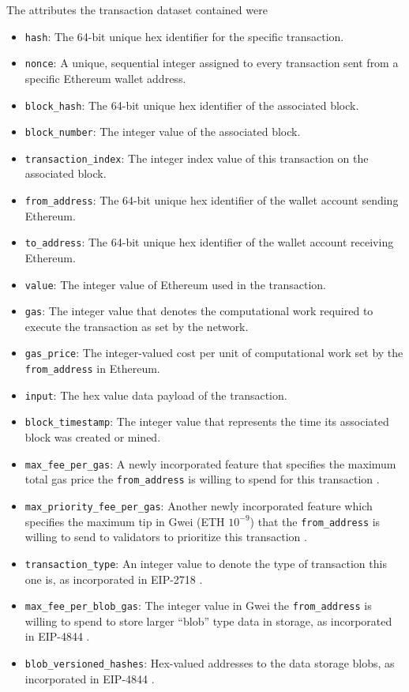 \documentclass[sigconf]{acmart}
\begin{document}
The attributes the transaction dataset contained were 
\begin{itemize}
    \item \texttt{hash}: The 64-bit unique hex identifier for the specific transaction.
    \item \texttt{nonce}: A unique, sequential integer assigned to every transaction sent from a specific Ethereum wallet address.
    \item \texttt{block\_hash}: The 64-bit unique hex identifier of the associated block.
    \item \texttt{block\_number}: The integer value of the associated block.
    \item \texttt{transaction\_index}: The integer index value of this transaction on the associated block.
    \item \texttt{from\_address}: The 64-bit unique hex identifier of the wallet account sending Ethereum.
    \item \texttt{to\_address}: The 64-bit unique hex identifier of the wallet account receiving Ethereum.
    \item \texttt{value}: The integer value of Ethereum used in the transaction.
    \item \texttt{gas}: The integer value that denotes the computational work required to execute the transaction as set by the network.
    \item \texttt{gas\_price}: The integer-valued cost per unit of computational work set by the \texttt{from\_address} in Ethereum.
    \item \texttt{input}: The hex value data payload of the transaction.
    \item \texttt{block\_timestamp}: The integer value that represents the time its associated block was created or mined.
    \item \texttt{max\_fee\_per\_gas}: A newly incorporated feature that specifies the maximum total gas price the \texttt{from\_address} is willing to spend for this transaction \citep{LondonHardfork}.
    \item \texttt{max\_priority\_fee\_per\_gas}: Another newly incorporated feature which specifies the maximum tip in Gwei (ETH $10^{-9}$) that the \texttt{from\_address} is willing to send to validators to prioritize this transaction \cite{LondonHardfork}.
    \item \texttt{transaction\_type}: An integer value to denote the type of transaction this one is, as incorporated in EIP-2718 \cite{TypedTransactions}.
    \item \texttt{max\_fee\_per\_blob\_gas}: The integer value in Gwei the \texttt{from\_address} is willing to spend to store larger “blob” type data in storage, as incorporated in EIP-4844 \cite{ProtoDanksharding}.
    \item \texttt{blob\_versioned\_hashes}: Hex-valued addresses to the data storage blobs, as incorporated in EIP-4844 \cite{ProtoDanksharding}.
\end{itemize}
\end{document}
